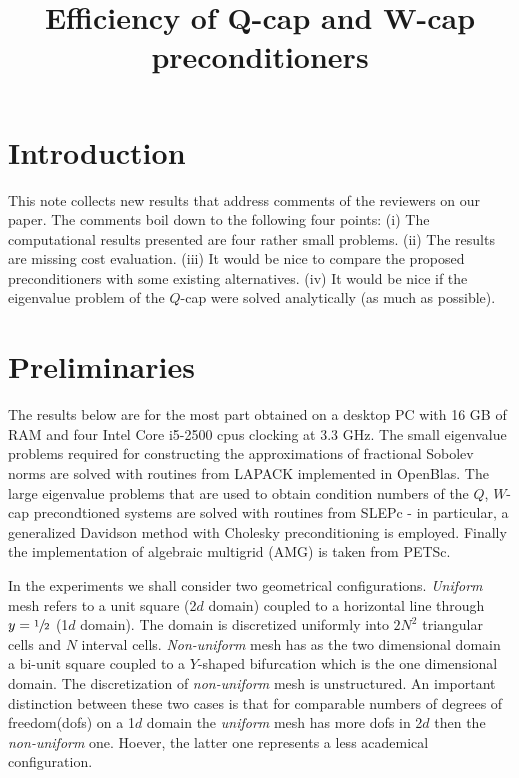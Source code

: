 \documentclass[10pt, a4paper]{article}
\title{Efficiency of Q-cap and W-cap preconditioners}
\begin{document}
\maketitle

\section*{Introduction}
This note collects new results that address comments of the reviewers on our paper. 
The comments boil down to the following four points: (i) The computational results 
presented are four rather small problems. (ii) The results are missing cost evaluation. 
(iii) It would be nice to compare the proposed preconditioners with some existing 
alternatives. (iv) It would be nice if the eigenvalue problem of the $Q$-cap were solved
analytically (as much as possible).

\section*{Preliminaries}
The results below are for the most part obtained on a desktop PC with 16 GB of RAM 
and four Intel Core i5-2500 cpus clocking at 3.3 GHz. The small eigenvalue problems 
required for constructing the approximations of fractional Sobolev norms are solved 
with routines from LAPACK\cite{lapack} implemented in OpenBlas\cite{openblas}. The 
large eigenvalue problems that are used to obtain condition numbers of the $Q$, $W$-cap 
precondtioned systems are solved with routines from SLEPc\cite{slepc} - in particular,
a generalized Davidson method with Cholesky preconditioning is employed. Finally the 
implementation of algebraic multigrid (AMG) is taken from PETSc\cite{petsc}.

In the experiments we shall consider two geometrical configurations. \textit{Uniform} 
mesh refers to a unit square (2$d$ domain) coupled to a horizontal line through 
$y=\sfrac{1}{2}$ (1$d$ domain). The domain is discretized uniformly into $2N^2$ 
triangular cells and $N$ interval cells. \textit{Non-uniform} mesh has as the two 
dimensional domain a bi-unit square coupled to a $Y$-shaped bifurcation which
is the one dimensional domain. The discretization of \textit{non-uniform} mesh is 
unstructured. An important distinction between these two cases is that for
comparable numbers of degrees of freedom(dofs) on a 1$d$ domain the
\textit{uniform} mesh has more dofs in 2$d$ then the \textit{non-uniform} one.
Hoever, the latter one represents a less academical configuration.
\end{document}
